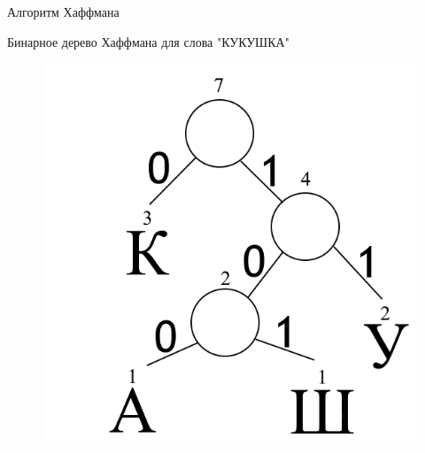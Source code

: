 \documentclass[11pt]{beamer}
\begin{document}
\begin{frame}{Алгоритм Хаффмана}
\begin{block}{Бинарное дерево Хаффмана для слова "КУКУШКА"}
\begin{figure}[H]
	\begin{center}
		\includegraphics[scale=0.42]{../pics/Huffman/huffman.png}
	\end{center}
\end{figure}	
\end{block}				
\end{frame}
\end{document}
